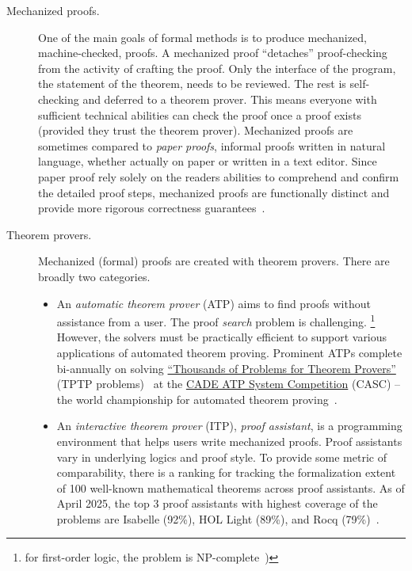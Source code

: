 \begin{description}
\item[Mechanized proofs.]
One of the main goals of formal methods is to produce mechanized, \ie machine-checked, proofs.
A mechanized proof \enquote{detaches} proof-checking from the activity of crafting the proof.
Only the interface of the program, \ie the statement of the theorem, needs to be reviewed.
The rest is self-checking and deferred to a theorem prover.
This means everyone with sufficient technical abilities can check the proof once a proof exists (provided they trust the theorem prover).
Mechanized proofs are sometimes compared to \emph{paper proofs}, \ie informal proofs written in natural language, whether actually on paper or written in a text editor.
Since paper proof rely solely on the readers abilities to comprehend and confirm the detailed proof steps, mechanized proofs are functionally distinct and provide more rigorous correctness guarantees~\cite{gonthier2008}.

\item[Theorem provers.]

Mechanized (formal) proofs are created with theorem provers.
There are broadly two categories.

   \begin{itemize}
   \item An \emph{automatic theorem prover} (ATP) aims to find proofs without assistance from a user.
   The proof \emph{search} problem is challenging.%
   \footnote{\Eg for first-order logic, the problem is NP-complete~\cite{cook1971, levin1973})}%
   However, the solvers must be practically efficient to support various applications of automated theorem proving.
   Prominent ATPs complete bi-annually on solving \href{https://www.tptp.org}{\enquote{Thousands of Problems for Theorem Provers}} (TPTP problems)~\cite{sutcliffe2024} at the \href{https://tptp.org/CASC/}{CADE ATP System Competition} (CASC) -- the world championship for automated theorem proving~\cite{casc}.

   \item An \emph{interactive theorem prover} (ITP), \aka \emph{proof assistant}, is a programming environment that helps users write mechanized proofs.
   Proof assistants vary in underlying logics and proof style.
   To provide some metric of comparability, there is a ranking for tracking the formalization extent of 100 well-known mathematical theorems across proof assistants.
   As of April 2025, the top 3 proof assistants with highest coverage of the problems are Isabelle (92\%), HOL Light (89\%), and Rocq (79\%)~\cite{hundredtheorems}.
   \end{itemize}


\end{description}
